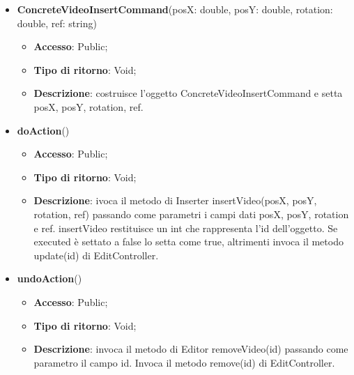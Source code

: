 {{{	
	\begin{itemize}
		\item \textbf{ConcreteVideoInsertCommand}(posX: double, posY: double, rotation: double, ref: string)
		\begin{itemize}
			\item \textbf{Accesso}: Public;
			\item \textbf{Tipo di ritorno}: Void;
			\item \textbf{Descrizione}: costruisce l’oggetto ConcreteVideoInsertCommand e setta posX, posY, rotation, ref.
		\end{itemize}
		\item \textbf{doAction}()
		\begin{itemize}
			\item \textbf{Accesso}: Public;
			\item \textbf{Tipo di ritorno}: Void;
			\item \textbf{Descrizione}: ivoca il metodo di Inserter insertVideo(posX, posY, rotation, ref) passando come parametri i  campi dati posX, posY, rotation e ref. insertVideo restituisce un int che rappresenta l’id dell’oggetto. Se executed è settato a false lo setta come true, altrimenti invoca il metodo update(id) di EditController.
		\end{itemize}
		\item \textbf{undoAction}()
		\begin{itemize}
			\item \textbf{Accesso}: Public;
			\item \textbf{Tipo di ritorno}: Void;
			\item \textbf{Descrizione}: invoca il metodo di Editor removeVideo(id) passando come parametro il campo id. Invoca il metodo remove(id) di EditController.
		\end{itemize}
	\end{itemize}
	}
}}
